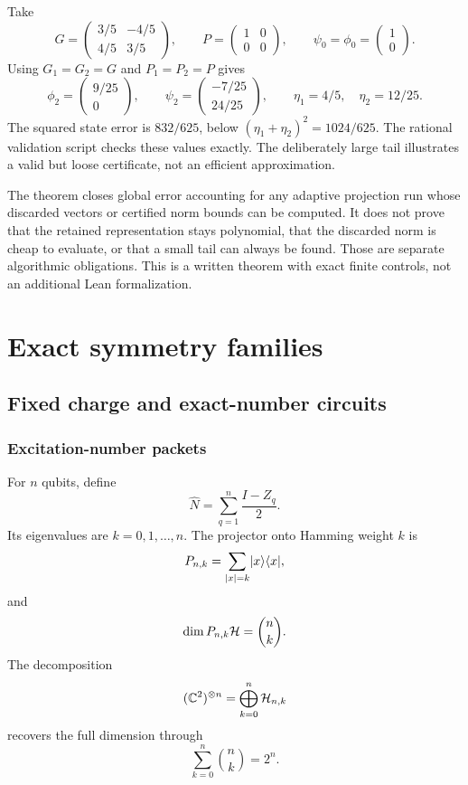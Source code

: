 \begin{example}
Take
\[
G=\begin{pmatrix}3/5&-4/5\\4/5&3/5\end{pmatrix},
\qquad
P=\begin{pmatrix}1&0\\0&0\end{pmatrix},
\qquad
\psi_0=\phi_0=\begin{pmatrix}1\\0\end{pmatrix}.
\]
Using $G_1=G_2=G$ and $P_1=P_2=P$ gives
\[
\phi_2=\begin{pmatrix}9/25\\0\end{pmatrix},\qquad
\psi_2=\begin{pmatrix}-7/25\\24/25\end{pmatrix},\qquad
\eta_1=4/5,\quad\eta_2=12/25.
\]
The squared state error is $832/625$, below $(\eta_1+\eta_2)^2=1024/625$. The rational validation script checks these values exactly. The deliberately large tail illustrates a valid but loose certificate, not an efficient approximation.
\end{example}

The theorem closes global error accounting for any adaptive projection run whose discarded vectors or certified norm bounds can be computed. It does not prove that the retained representation stays polynomial, that the discarded norm is cheap to evaluate, or that a small tail can always be found. Those are separate algorithmic obligations. This is a written theorem with exact finite controls, not an additional Lean formalization.

\chapter{Exact symmetry families}
\section{Fixed charge and exact-number circuits}
\label{s:ch:fixed-charge}

\subsection{Excitation-number packets}
For $n$ qubits, define
\[
\widehat N
=
\sum_{q=1}^n\frac{I-Z_q}{2}.
\]
Its eigenvalues are $k=0,1,\ldots,n$. The projector onto Hamming weight $k$ is
\[
P_{n,k}
=
\sum_{|x|=k}\lvert x\rangle\langle x\rvert,
\]
and
\[
\dim P_{n,k}\mathcal H
=
\binom nk.
\]
The decomposition
\[
(\mathbb C^2)^{\otimes n}
=
\bigoplus_{k=0}^n\mathcal H_{n,k}
\]
recovers the full dimension through
\[
\sum_{k=0}^n\binom nk=2^n.
\]

